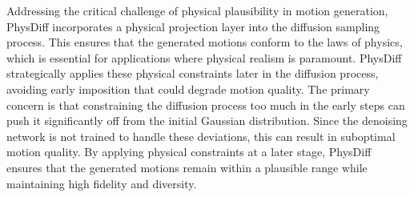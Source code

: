 Addressing the critical challenge of physical plausibility in motion generation, PhysDiff \cite{yuan2023physdiff} incorporates a physical projection layer into the diffusion sampling process. This ensures that the generated motions conform to the laws of physics, which is essential for applications where physical realism is paramount. PhysDiff strategically applies these physical constraints later in the diffusion process, avoiding early imposition that could degrade motion quality. The primary concern is that constraining the diffusion process too much in the early steps can push it significantly off from the initial Gaussian distribution. Since the denoising network is not trained to handle these deviations, this can result in suboptimal motion quality. By applying physical constraints at a later stage, PhysDiff ensures that the generated motions remain within a plausible range while maintaining high fidelity and diversity.
















